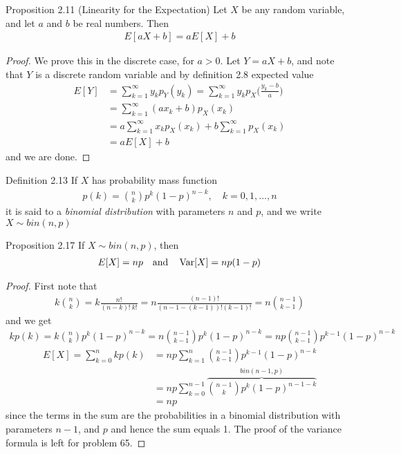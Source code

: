 \begin{boks}{Proposition 2.11 (Linearity for the Expectation)}
Let $X$ be any random variable, and let $a$ and $b$ be real numbers. Then
\begin{align*}
    E[aX + b] = aE[X] + b
\end{align*}
\end{boks}

\begin{proof}
We prove this in the discrete case, for $a > 0$. Let $Y = aX + b$, and note that $Y$ is a discrete random variable and by definition 2.8 expected value
\begin{align*}
    E[Y] &= \sum_{k=1}^\infty y_kp_Y(y_k) = \sum_{k=1}^\infty y_kp_X\bigg(\frac{y_k - b}{a}\bigg)\\
    &= \sum_{k=1}^\infty (ax_k + b) p_X(x_k) \\
    &= a\sum_{k=1}^\infty x_kp_X(x_k) + b \sum_{k=1}^\infty p_X(x_k)\\
    &= aE[X] + b
\end{align*}
and we are done.
\end{proof}

\begin{boks}{Definition 2.13}
  If $X$ has probability mass function
  \begin{align*}
    p(k) = \binom{n}{k} p^k (1 - p)^{n - k}, \quad k = 0, 1, \ldots, n
  \end{align*}
  it is said to a \textit{binomial distribution} with parameters $n$ and $p$, and we write $X \sim bin(n,p)$
\end{boks}

\begin{boks}{Proposition 2.17}
  If $X \sim bin(n, p)$, then
  \begin{align*}
    E[X] = np \quad \text{and} \quad \operatorname{Var}[X] = np(1 - p)
  \end{align*}
\end{boks}
\begin{proof}
  First note that
  \begin{align*}
    k \binom{n}{k}  = k \frac{n!}{(n - k)! \ k!}
                    = n \frac{(n - 1)!}{(n - 1 - (k - 1))! (k - 1)!}
                    = n \binom{n - 1}{k - 1}
  \end{align*}
  and we get
  \begin{align*}
    k p(k)  = k \binom{n}{k} p^k (1 - p)^{n - k}
            = n \binom{n - 1}{k - 1} p^k (1 - p)^{n - k}
            = np \binom{n - 1}{k - 1} p^{k - 1} (1 - p)^{n - k}
  \end{align*}
  \begin{align*}
    E[X] = \sum_{k = 0}^n kp(k) &= np \sum_{k = 1}^n \binom{n - 1}{k - 1}p^{k - 1}(1 - p)^{n - k}\\
    &= np \sum_{k = 0}^{n - 1} \overbrace{\binom{n - 1}{k} p^k (1 - p)^{n - 1 - k}}^{bin(n - 1, p)} \\
    &= np
  \end{align*}
  since the terms in the sum are the probabilities in a binomial distribution with parameters $n - 1$, and $p$ and hence the sum equals 1.
  The proof of the variance formula is left for problem 65.
\end{proof}
